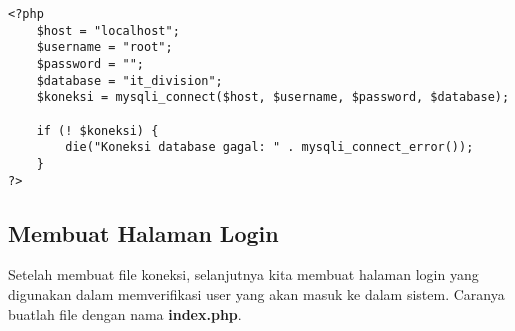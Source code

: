 \begin{lstlisting}
<?php
    $host = "localhost";
    $username = "root";
    $password = "";
    $database = "it_division";
    $koneksi = mysqli_connect($host, $username, $password, $database);

    if (! $koneksi) {
        die("Koneksi database gagal: " . mysqli_connect_error());
    }
?>
\end{lstlisting}

\subsection{Membuat Halaman Login}
Setelah membuat file koneksi, selanjutnya kita membuat halaman login yang digunakan dalam memverifikasi user yang akan masuk ke dalam sistem. Caranya buatlah file dengan nama \textbf{index.php}.

